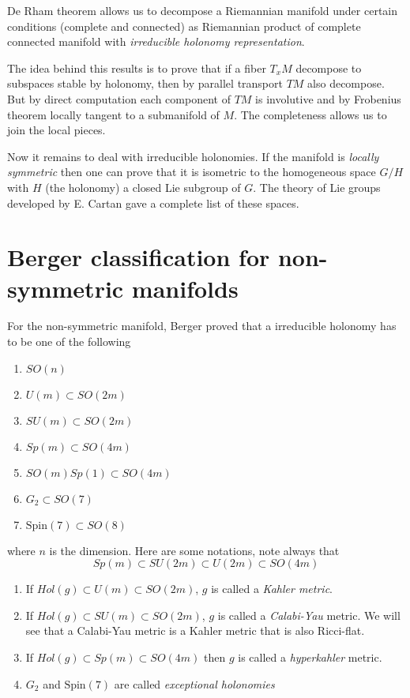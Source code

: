 \documentclass[11pt]{article}
\begin{document}
De Rham theorem allows us to decompose a Riemannian manifold under certain conditions (complete and
connected) as Riemannian product of complete connected manifold with \emph{irreducible holonomy representation}.

The idea behind this results is to prove that if a fiber \(T_xM\) decompose to subspaces stable by
holonomy, then by parallel transport \(TM\) also decompose. But by direct computation each
component of \(TM\) is involutive and by Frobenius theorem locally tangent to a submanifold of
\(M\). The completeness allows us to join the local pieces.

Now it remains to deal with irreducible holonomies. If the manifold is \emph{locally symmetric} then one
can prove that it is isometric to the homogeneous space \(G/H\) with \(H\) (the holonomy) a closed Lie
subgroup of \(G\). The theory of Lie groups developed by E. Cartan gave a complete list of these spaces.


\section{Berger classification for non-symmetric manifolds}
\label{sec:org271eb6a}

For the non-symmetric manifold, Berger proved that a irreducible holonomy has to be one of the
following
\begin{enumerate}
\item \(SO(n)\)
\item \(U(m)\subset SO(2m)\)
\item \(SU(m)\subset SO(2m)\)
\item \(Sp(m) \subset SO(4m)\)
\item \(SO(m)Sp(1) \subset SO(4m)\)
\item \(G_2\subset SO(7)\)
\item \(\text{Spin}(7)\subset SO(8)\)
\end{enumerate}

where \(n\) is the dimension. Here are some notations, note always that
\[
Sp(m)\subset SU(2m)\subset U(2m)\subset SO(4m)
\]
\begin{enumerate}
\item If \(Hol(g)\subset U(m)\subset SO(2m)\), \(g\) is called a \emph{Kahler metric}.
\item If \(Hol(g)\subset SU(m)\subset SO(2m)\), \(g\) is called a \emph{Calabi-Yau} metric. We will see that a
Calabi-Yau metric is a Kahler metric that is also Ricci-flat.
\item If \(Hol(g)\subset Sp(m)\subset SO(4m)\) then \(g\) is called a \emph{hyperkahler} metric.
\item \(G_2\) and \(\text{Spin}(7)\) are called \emph{exceptional holonomies}
\end{enumerate}
\end{document}
